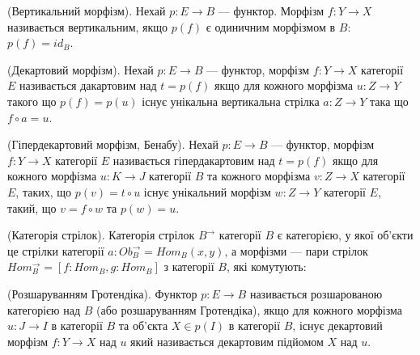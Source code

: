 \begin{definition} (Вертикальний морфізм).
Нехай $p: E \rightarrow B$ --- функтор. Морфізм $f : Y \rightarrow X$ називається
вертикальним, якщо $p(f)$ є одиничним морфізмом в $B$: $p(f)=id_B$.
\end{definition}

\begin{definition} (Декартовий морфізм).
Нехай $p : E \rightarrow B$ --- функтор,
морфізм $f : Y \rightarrow X$ категорії $E$
називається дакартовим над $t=p(f)$ якщо
для кожного морфізма $u : Z \rightarrow Y$ такого що $p(f)=p(u)$
існує унікальна вертикальна стрілка $a : Z \rightarrow Y$ така що $f\circ a = u$.
\end{definition}

\begin{definition} (Гіпердекартовий морфізм, Бенабу).
Нехай $p : E \rightarrow B$ --- функтор,
морфізм $f : Y \rightarrow X$ категорії $E$
називається гіпердакартовим над $t=p(f)$ якщо
для кожного морфізма $u : K \rightarrow J$ категорії $B$
та кожного морфізма $v : Z \rightarrow X$ категорії $E$,
таких, що $p(v)=t\circ u$ існує унікальний морфізм $w : Z \rightarrow Y$ категорії $E$,
такий, що $v=f\circ w$ та $p(w)=u$.
\end{definition}

\begin{definition} (Категорія стрілок). Категорія стрілок $B^\rightarrow$ категорії $B$ є категорією,
у якої об'єкти це стрілки категорії $a : Ob_B^\rightarrow = Hom_B(x,y)$, а морфізми --- пари
стрілок $Hom_B^\rightarrow = [f : Hom_B, g : Hom_B]$ з категорії $B$, які комутують:
\begin{center}
\end{center}
\end{definition}

\begin{definition} (Розшаруванням Гротендіка). Функтор $p : E \rightarrow B$ називається
розшарованою категорією над $B$ (або розшаруванням Гротендіка), якщо
для кожного морфізма $u : J \rightarrow I$ в категорії $B$ та об'єкта $X \in p(I)$ в категорії $B$,
існує декартовий морфізм $f : Y \rightarrow X$ над $u$ який називається декартовим підйомом $X$ над $u$.
\end{definition}

